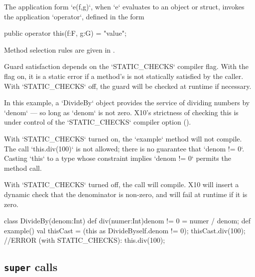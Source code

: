 The application form \xcd`e(f,g)`, when \xcd`e` evaluates to an object or
struct, invokes the application \xcd`operator`, 
defined in the form 
\begin{xten}
public operator this(f:F, g:G) = "value";
\end{xten}


Method selection rules are given in .

Guard satisfaction depends on the \xcd`STATIC_CHECKS` compiler flag. 
With the flag on,
it is a static error if a method's  is not statically
satisfied by the 
caller.  
With \xcd`STATIC_CHECKS` off, the guard will be checked at runtime if
necessary. 

\begin{ex}
In this example, a \xcd`DivideBy` object provides the service of dividing
numbers by \xcd`denom` --- so long as \xcd`denom` is not zero. 
X10's strictness of checking this is under control of the \xcd`STATIC_CHECKS`
compiler option ().  

With \xcd`STATIC_CHECKS` turned on,  the \xcd`example` method will not
compile.  The call \xcd`this.div(100)`  is not allowed; there is no
guarantee that \xcd`denom != 0`.  Casting \xcd`this` to a type 
whose constraint implies \xcd`denom != 0` permits the method call.

With \xcd`STATIC_CHECKS` turned off, the call will compile.
X10 will insert a dynamic check that the denominator is non-zero, and will
fail at runtime if it is zero.

\begin{xten}
class DivideBy(denom:Int) {
  def div(numer:Int){denom != 0} = numer / denom;
  def example() {
     val thisCast = (this as DivideBy{self.denom != 0});
     thisCast.div(100);
     //ERROR (with STATIC_CHECKS): this.div(100);  
  }
}
\end{xten}



\end{ex}


\subsection{{\tt super} calls}

